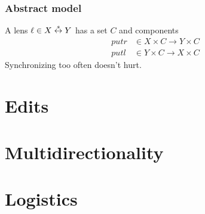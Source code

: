 \documentclass[14pt]{beamer}
\begin{document}
\begin{frame}
    \frametitle{Abstract model}
    A lens $\ell \in X \stackrel s\leftrightarrow Y$ has a set $C$ and components
    \begin{align*}
        putr &\in X\times C \to Y\times C \\
        putl &\in Y\times C \to X\times C
    \end{align*}
    \pause
    Synchronizing too often doesn't hurt.
    \begin{center}
    \end{center}
\end{frame}

\section{Edits}
\section{Multidirectionality}
\section{Logistics}
\end{document}
